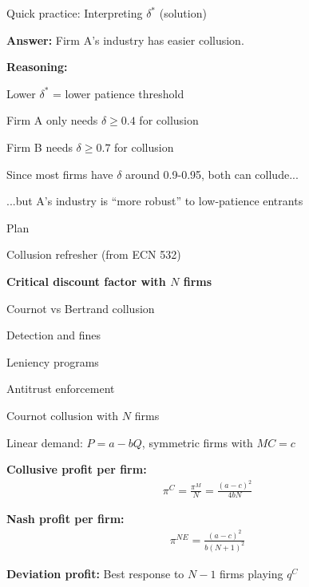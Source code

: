 \documentclass[notes,11pt, aspectratio=169]{beamer}
\newenvironment{wideitemize}{\itemize\addtolength{\itemsep}{10pt}}{\enditemize}
\newenvironment{wideenumerate}{\enumerate\addtolength{\itemsep}{10pt}}{\endenumerate}
\begin{document}
\begin{frame}{Quick practice: Interpreting $\delta^*$ (solution)}
	\begin{wideitemize}
		\item \textbf{Answer:} Firm A's industry has easier collusion.
		\item \textbf{Reasoning:}
		\begin{wideitemize}
			\vspace{5pt}
			\item Lower $\delta^*$ = lower patience threshold
			\item Firm A only needs $\delta \geq 0.4$ for collusion
			\item Firm B needs $\delta \geq 0.7$ for collusion
			\item Since most firms have $\delta$ around 0.9-0.95, both can collude...
			\item ...but A's industry is ``more robust'' to low-patience entrants
		\end{wideitemize}
	\end{wideitemize}
\end{frame}

\begin{frame}{Plan}
  \begin{wideenumerate}
    \item Collusion refresher (from ECN 532)
    \item \textbf{Critical discount factor with $N$ firms}
    \item Cournot vs Bertrand collusion
    \item Detection and fines
    \item Leniency programs
    \item Antitrust enforcement
  \end{wideenumerate}
\end{frame}

\begin{frame}{Cournot collusion with $N$ firms}
	\begin{wideitemize}
		\item Linear demand: $P = a - bQ$, symmetric firms with $MC = c$
		\item \textbf{Collusive profit per firm:}
		\begin{align*}
			\pi^C = \frac{\pi^M}{N} = \frac{(a-c)^2}{4bN}
		\end{align*}
		\item \textbf{Nash profit per firm:}
		\begin{align*}
			\pi^{NE} = \frac{(a-c)^2}{b(N+1)^2}
		\end{align*}
		\item \textbf{Deviation profit:} Best response to $N-1$ firms playing $q^C$
	\end{wideitemize}
\end{frame}
\end{document}
